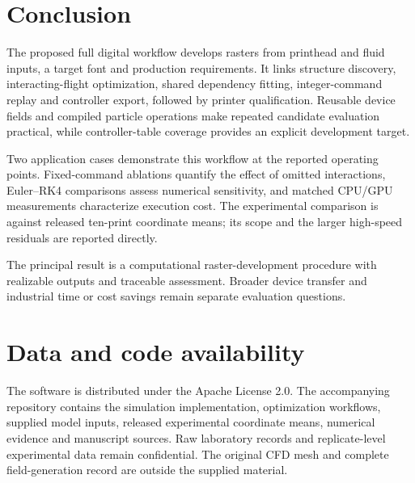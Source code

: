 \section{Conclusion}
The proposed full digital workflow develops rasters from printhead and fluid inputs, a target font and production requirements. It links structure discovery, interacting-flight optimization, shared dependency fitting, integer-command replay and controller export, followed by printer qualification. Reusable device fields and compiled particle operations make repeated candidate evaluation practical, while controller-table coverage provides an explicit development target.

Two application cases demonstrate this workflow at the reported operating points. Fixed-command ablations quantify the effect of omitted interactions, Euler--RK4 comparisons assess numerical sensitivity, and matched CPU/GPU measurements characterize execution cost. The experimental comparison is against released ten-print coordinate means; its scope and the larger high-speed residuals are reported directly.

The principal result is a computational raster-development procedure with realizable outputs and traceable assessment. Broader device transfer and industrial time or cost savings remain separate evaluation questions.

\section*{Data and code availability}
The software is distributed under the Apache License 2.0. The accompanying repository contains the simulation implementation, optimization workflows, supplied model inputs, released experimental coordinate means, numerical evidence and manuscript sources. Raw laboratory records and replicate-level experimental data remain confidential. The original CFD mesh and complete field-generation record are outside the supplied material.

